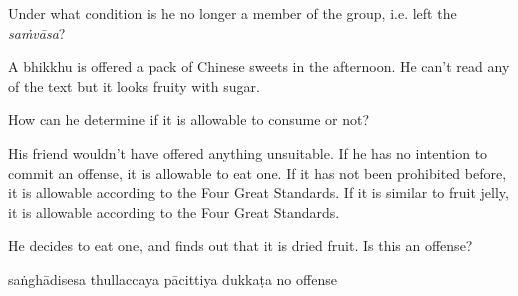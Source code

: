 \begin{exam}{\autoExamName}
\begin{problem*}
\begin{parts}
    \bigskip

    \fillin{12cm}{}

    \item Under what condition is he no longer a member of the group, i.e. left the \emph{saṁvāsa}?

    \bigskip

    \fillin{12cm}{}

  \end{parts}

\end{problem*}

\ifnosolutions
\clearpage
\else
\problemDivide
\fi

\begin{problem*}

  A bhikkhu is offered a pack of Chinese sweets in the afternoon. He can't read any of the text but it looks fruity with sugar.

  \bigskip

  \begin{parts}

    \item How can he determine if it is allowable to consume or not?

    \bigskip

    \begin{answers}{1}
      \bChoices
       His friend wouldn't have offered anything unsuitable. \eAns
       If he has no intention to commit an offense, it is allowable to eat one. \eAns
       If it has not been prohibited before, it is allowable according to the Four Great Standards. \eAns
       If it is similar to fruit jelly, it is allowable according to the Four Great Standards. \eAns
      \eChoices
    \end{answers}

    \bigskip

    \item He decides to eat one, and finds out that it is dried fruit. Is this an offense?

    \bigskip

    \begin{answers}{5}
      \bChoices
       saṅghādisesa\eAns
       thullaccaya\eAns
       pācittiya\eAns
       dukkaṭa\eAns
       no offense\eAns
      \eChoices
    \end{answers}

  \end{parts}

\end{problem*}


\end{exam}
